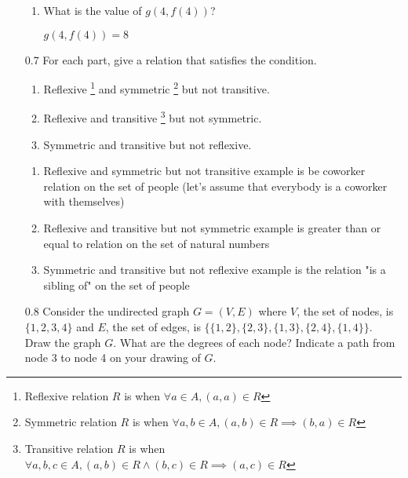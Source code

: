 \documentclass[12pt, a4paper]{article}
\begin{document}
\begin{enumerate}
\begin{enumerate}
\item What is the value of $g(4, f(4))$?

    $g(4, f(4)) = 8$
\end{enumerate}

    \item[0.7]
For each part, give a relation that satisfies the condition.
\begin{enumerate}
    \item  Reflexive
    \footnote{Reflexive relation $R$ is when $\forall a \in A, (a, a) \in R$} and symmetric
    \footnote{Symmetric relation $R$ is when $\forall a, b \in A, (a, b) \in R \implies (b, a) \in R$} but not transitive.
    \item  Reflexive and transitive
    \footnote{Transitive relation $R$ is when $\forall a, b, c \in A, (a, b) \in R \land (b, c) \in R \implies (a, c) \in R$} but not symmetric.
    \item  Symmetric and transitive but not reflexive.
\end{enumerate}

\begin{enumerate}

    \item Reflexive and symmetric but not transitive example is be coworker relation on the set of people (let's assume that everybody is a coworker with themselves)
    \item Reflexive and transitive but not symmetric example is greater than or equal to relation on the set of natural numbers
    \item Symmetric and transitive but not reflexive example is the relation "is a sibling of" on the set of people
\end{enumerate}

    \item[0.8]
Consider the undirected graph $G = (V, E)$ where $V$, the set of nodes, is $\{1, 2, 3, 4\}$ and $E$, the set of edges, is $\{\{1, 2\}, \{2, 3\}, \{1, 3\}, \{2, 4\}, \{1, 4\}\}$. Draw the graph $G$. What are the degrees of each node? Indicate a path from node 3 to node 4 on your drawing of $G$.



\end{enumerate}
\end{document}

